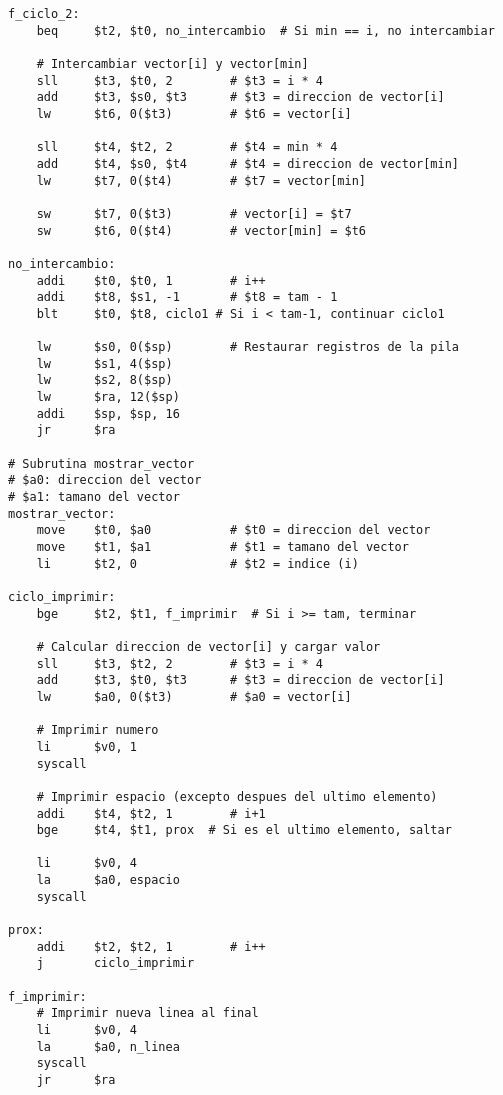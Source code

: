 \documentclass{article}
\begin{document}
\begin{lstlisting}
f_ciclo_2:
    beq     $t2, $t0, no_intercambio  # Si min == i, no intercambiar
    
    # Intercambiar vector[i] y vector[min]
    sll     $t3, $t0, 2        # $t3 = i * 4
    add     $t3, $s0, $t3      # $t3 = direccion de vector[i]
    lw      $t6, 0($t3)        # $t6 = vector[i]
   
    sll     $t4, $t2, 2        # $t4 = min * 4
    add     $t4, $s0, $t4      # $t4 = direccion de vector[min]
    lw      $t7, 0($t4)        # $t7 = vector[min]
    
    sw      $t7, 0($t3)        # vector[i] = $t7
    sw      $t6, 0($t4)        # vector[min] = $t6
    
no_intercambio:
    addi    $t0, $t0, 1        # i++
    addi    $t8, $s1, -1       # $t8 = tam - 1
    blt     $t0, $t8, ciclo1 # Si i < tam-1, continuar ciclo1
    
    lw      $s0, 0($sp)        # Restaurar registros de la pila
    lw      $s1, 4($sp)
    lw      $s2, 8($sp)
    lw      $ra, 12($sp)
    addi    $sp, $sp, 16
    jr      $ra

# Subrutina mostrar_vector
# $a0: direccion del vector
# $a1: tamano del vector
mostrar_vector:
    move    $t0, $a0           # $t0 = direccion del vector
    move    $t1, $a1           # $t1 = tamano del vector
    li      $t2, 0             # $t2 = indice (i)
    
ciclo_imprimir:
    bge     $t2, $t1, f_imprimir  # Si i >= tam, terminar
    
    # Calcular direccion de vector[i] y cargar valor
    sll     $t3, $t2, 2        # $t3 = i * 4
    add     $t3, $t0, $t3      # $t3 = direccion de vector[i]
    lw      $a0, 0($t3)        # $a0 = vector[i]
    
    # Imprimir numero
    li      $v0, 1
    syscall
    
    # Imprimir espacio (excepto despues del ultimo elemento)
    addi    $t4, $t2, 1        # i+1
    bge     $t4, $t1, prox  # Si es el ultimo elemento, saltar
    
    li      $v0, 4
    la      $a0, espacio
    syscall
    
prox:
    addi    $t2, $t2, 1        # i++
    j       ciclo_imprimir
    
f_imprimir:
    # Imprimir nueva linea al final
    li      $v0, 4
    la      $a0, n_linea
    syscall
    jr      $ra

\end{lstlisting}
\end{document}
